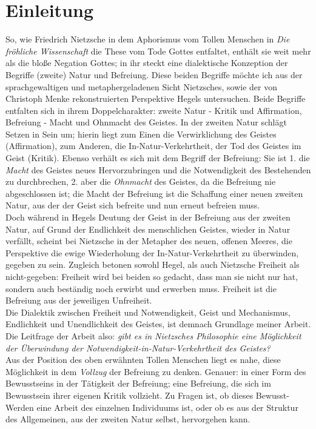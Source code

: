 \documentclass[12pt, a4paper, openany]{report}
\newcommand\mainmatter{ \cleardoublepage \pagenumbering{arabic}}
\begin{document}
\tableofcontents

\mainmatter

\chapter{Einleitung}
So, wie Friedrich Nietzsche in dem Aphorismus vom \glqq Tollen Menschen\grqq{} in \textit{Die fröhliche Wissenschaft} die These vom Tode Gottes entfaltet, enthält sie weit mehr als die bloße Negation Gottes;
in ihr steckt eine dialektische Konzeption der Begriffe (zweite) Natur und Befreiung.
Diese beiden Begriffe möchte ich aus der sprachgewaltigen und metaphergeladenen Sicht Nietzsches, sowie der von Christoph Menke rekonstruierten Perspektive Hegels untersuchen.
Beide Begriffe entfalten sich in ihrem Doppelcharakter: zweite Natur - Kritik und Affirmation, Befreiung - Macht und Ohnmacht des Geistes.
In der zweiten Natur schlägt Setzen in Sein um; hierin liegt zum Einen die Verwirklichung des Geistes (Affirmation), zum Anderen, die In-Natur-Verkehrtheit, der Tod des Geistes im Geist (Kritik).
Ebenso verhält es sich mit dem Begriff der Befreiung: 
Sie ist 1. die \textit{Macht} des Geistes neues Hervorzubringen und die Notwendigkeit des Bestehenden zu durchbrechen, 
2. aber die \textit{Ohnmacht} des Geistes, da die Befreiung nie abgeschlossen ist; die Macht der Befreiung ist die Schaffung einer \glqq neuen\grqq{} zweiten Natur, aus der der Geist sich befreite und nun erneut befreien muss.\\
Doch während in Hegels Deutung der Geist in der Befreiung aus der zweiten Natur, auf Grund der Endlichkeit des menschlichen Geistes, wieder in Natur verfällt, scheint bei Nietzsche in der Metapher des neuen, offenen Meeres, die Perspektive die ewige Wiederholung der In-Natur-Verkehrtheit zu überwinden, gegeben zu sein.
Zugleich betonen sowohl Hegel, als auch Nietzsche Freiheit als nicht-gegeben: 
Freiheit wird bei beiden so gedacht, dass man sie \glqq nicht nur hat, sondern auch beständig  noch erwirbt und erwerben muss\grqq{}. 
Freiheit ist die Befreiung aus der jeweiligen Unfreiheit. \\
Die Dialektik zwischen Freiheit und Notwendigkeit, Geist und Mechanismus, Endlichkeit und Unendlichkeit des Geistes, ist demnach Grundlage meiner Arbeit. 
Die Leitfrage der Arbeit also: \textit{gibt es in Nietzsches Philosophie eine Möglichkeit der Überwindung der Notwendigkeit-in-Natur-Verkehrtheit des Geistes?}\\
Aus der Position des oben erwähnten \glqq Tollen Menschen\grqq{} liegt es nahe, diese Möglichkeit in dem \textit{Vollzug} der Befreiung zu denken. 
Genauer: in einer Form des Bewusstseins in der Tätigkeit der Befreiung; 
eine Befreiung, die sich im Bewusstsein ihrer eigenen Kritik vollzieht.
Zu Fragen ist, ob dieses Bewusst-Werden eine Arbeit des einzelnen Individuums ist, oder ob es aus der Struktur des Allgemeinen, aus der zweiten Natur selbst, hervorgehen kann.\\
\end{document}
